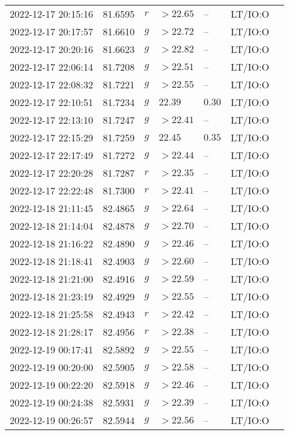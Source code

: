 \documentclass{nature_plusfigure}
\begin{document}
\begin{supplement}
\begin{center}
\begin{longtable}{lllllll}
2022-12-17 20:15:16 & 81.6595 & $r$ & $>22.65$ & -- & LT/IO:O &  \\ 
2022-12-17 20:17:57 & 81.6610 & $g$ & $>22.72$ & -- & LT/IO:O &  \\ 
2022-12-17 20:20:16 & 81.6623 & $g$ & $>22.82$ & -- & LT/IO:O &  \\ 
2022-12-17 22:06:14 & 81.7208 & $g$ & $>22.51$ & -- & LT/IO:O &  \\ 
2022-12-17 22:08:32 & 81.7221 & $g$ & $>22.55$ & -- & LT/IO:O &  \\ 
2022-12-17 22:10:51 & 81.7234 & $g$ & $22.39$ & $0.30$ & LT/IO:O &  \\ 
2022-12-17 22:13:10 & 81.7247 & $g$ & $>22.41$ & -- & LT/IO:O &  \\ 
2022-12-17 22:15:29 & 81.7259 & $g$ & $22.45$ & $0.35$ & LT/IO:O &  \\ 
2022-12-17 22:17:49 & 81.7272 & $g$ & $>22.44$ & -- & LT/IO:O &  \\ 
2022-12-17 22:20:28 & 81.7287 & $r$ & $>22.35$ & -- & LT/IO:O &  \\ 
2022-12-17 22:22:48 & 81.7300 & $r$ & $>22.41$ & -- & LT/IO:O &  \\ 
2022-12-18 21:11:45 & 82.4865 & $g$ & $>22.64$ & -- & LT/IO:O &  \\ 
2022-12-18 21:14:04 & 82.4878 & $g$ & $>22.70$ & -- & LT/IO:O &  \\ 
2022-12-18 21:16:22 & 82.4890 & $g$ & $>22.46$ & -- & LT/IO:O &  \\ 
2022-12-18 21:18:41 & 82.4903 & $g$ & $>22.60$ & -- & LT/IO:O &  \\ 
2022-12-18 21:21:00 & 82.4916 & $g$ & $>22.59$ & -- & LT/IO:O &  \\ 
2022-12-18 21:23:19 & 82.4929 & $g$ & $>22.55$ & -- & LT/IO:O &  \\ 
2022-12-18 21:25:58 & 82.4943 & $r$ & $>22.42$ & -- & LT/IO:O &  \\ 
2022-12-18 21:28:17 & 82.4956 & $r$ & $>22.38$ & -- & LT/IO:O &  \\ 
2022-12-19 00:17:41 & 82.5892 & $g$ & $>22.55$ & -- & LT/IO:O &  \\ 
2022-12-19 00:20:00 & 82.5905 & $g$ & $>22.58$ & -- & LT/IO:O &  \\ 
2022-12-19 00:22:20 & 82.5918 & $g$ & $>22.46$ & -- & LT/IO:O &  \\ 
2022-12-19 00:24:38 & 82.5931 & $g$ & $>22.39$ & -- & LT/IO:O &  \\ 
2022-12-19 00:26:57 & 82.5944 & $g$ & $>22.56$ & -- & LT/IO:O &  \\ 

\end{longtable}
\end{center}
\end{supplement}
\end{document}
